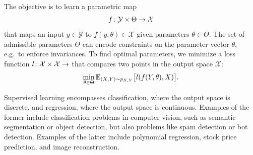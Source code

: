 The objective is to learn a parametric map
\begin{equation}
	f \colon \mathcal{Y} \times \Theta \to \mathcal{X}
\end{equation}
that maps an input \( y \in \mathcal{Y} \) to \( f(y, \theta) \in \mathcal{X} \) given parameters \( \theta \in \Theta \).
The set of admissible parameters \( \Theta \) can encode constraints on the parameter vector \( \theta \), e.g.\ to enforce invariances.
To find optimal parameters, we minimize a loss function \( l \colon \mathcal{X} \times \mathcal{X} \to \) that compares two points in the output space \( \mathcal{X} \):
\begin{equation}
	\min_{\theta \in \Theta}\mathbb{E}_{(X, Y)\sim p_{X,Y}}\bigl[ l(f(Y, \theta), X) \bigr].
\end{equation}

Supervised learning encompasses classification, where the output space is discrete, and regression, where the output space is continuous.
Examples of the former include classification problems in computer vision, such as semantic segmentation or object detection, but also problems like spam detection or bot detection.
Examples of the latter include polynomial regression, stock price prediction, and image reconstruction.

